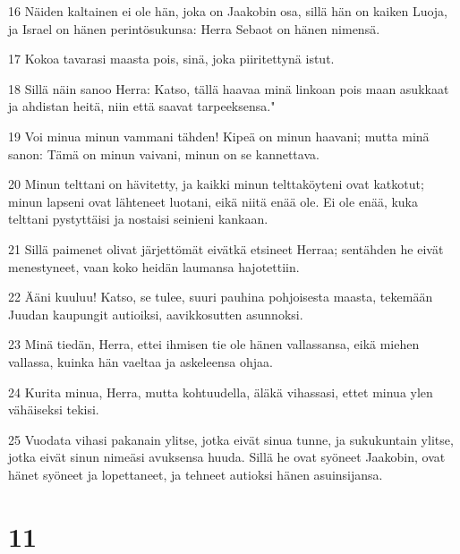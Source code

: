 \par 16 Näiden kaltainen ei ole hän, joka on Jaakobin osa, sillä hän on kaiken Luoja, ja Israel on hänen perintösukunsa: Herra Sebaot on hänen nimensä.
\par 17 Kokoa tavarasi maasta pois, sinä, joka piiritettynä istut.
\par 18 Sillä näin sanoo Herra: Katso, tällä haavaa minä linkoan pois maan asukkaat ja ahdistan heitä, niin että saavat tarpeeksensa."
\par 19 Voi minua minun vammani tähden! Kipeä on minun haavani; mutta minä sanon: Tämä on minun vaivani, minun on se kannettava.
\par 20 Minun telttani on hävitetty, ja kaikki minun telttaköyteni ovat katkotut; minun lapseni ovat lähteneet luotani, eikä niitä enää ole. Ei ole enää, kuka telttani pystyttäisi ja nostaisi seinieni kankaan.
\par 21 Sillä paimenet olivat järjettömät eivätkä etsineet Herraa; sentähden he eivät menestyneet, vaan koko heidän laumansa hajotettiin.
\par 22 Ääni kuuluu! Katso, se tulee, suuri pauhina pohjoisesta maasta, tekemään Juudan kaupungit autioiksi, aavikkosutten asunnoksi.
\par 23 Minä tiedän, Herra, ettei ihmisen tie ole hänen vallassansa, eikä miehen vallassa, kuinka hän vaeltaa ja askeleensa ohjaa.
\par 24 Kurita minua, Herra, mutta kohtuudella, äläkä vihassasi, ettet minua ylen vähäiseksi tekisi.
\par 25 Vuodata vihasi pakanain ylitse, jotka eivät sinua tunne, ja sukukuntain ylitse, jotka eivät sinun nimeäsi avuksensa huuda. Sillä he ovat syöneet Jaakobin, ovat hänet syöneet ja lopettaneet, ja tehneet autioksi hänen asuinsijansa.

\chapter{11}

